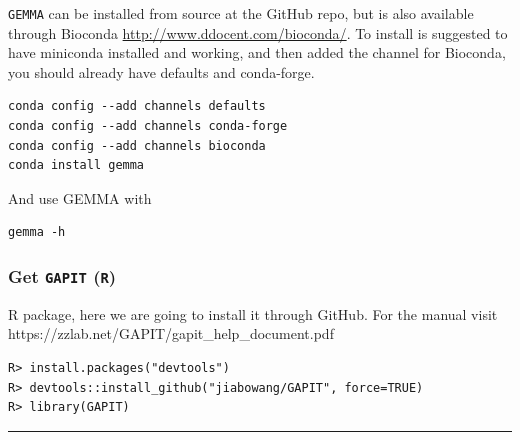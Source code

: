 \texttt{GEMMA} can be installed from source at the GitHub repo, but is
also available through Bioconda \url{http://www.ddocent.com/bioconda/}.
To install is suggested to have miniconda installed and working, and
then added the channel for Bioconda, you should already have defaults
and conda-forge.

\begin{verbatim}
conda config --add channels defaults
conda config --add channels conda-forge
conda config --add channels bioconda
conda install gemma
\end{verbatim}

And use GEMMA with

\begin{verbatim}
gemma -h
\end{verbatim}

\hypertarget{get-gapit-r}{%
\subsubsection{\texorpdfstring{Get \texttt{GAPIT}
(\texttt{R})}{Get GAPIT (R)}}\label{get-gapit-r}}

R package, here we are going to install it through GitHub. For the
manual visit https://zzlab.net/GAPIT/gapit\_help\_document.pdf

\begin{verbatim}
R> install.packages("devtools")
R> devtools::install_github("jiabowang/GAPIT", force=TRUE)
R> library(GAPIT)
\end{verbatim}

\begin{center}\rule{0.5\linewidth}{0.5pt}\end{center}
